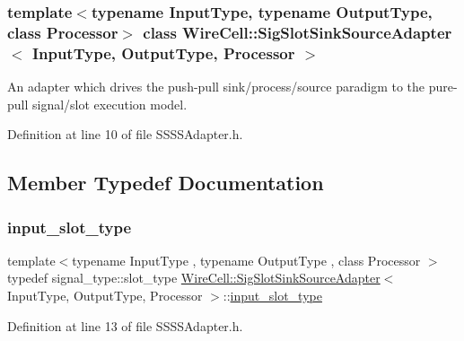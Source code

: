 \subsubsection*{template$<$typename Input\+Type, typename Output\+Type, class Processor$>$\newline
class Wire\+Cell\+::\+Sig\+Slot\+Sink\+Source\+Adapter$<$ Input\+Type, Output\+Type, Processor $>$}

An adapter which drives the push-\/pull sink/process/source paradigm to the pure-\/pull signal/slot execution model. 

Definition at line 10 of file S\+S\+S\+S\+Adapter.\+h.



\subsection{Member Typedef Documentation}
\mbox{\label{class_wire_cell_1_1_sig_slot_sink_source_adapter_ab53f4d64b24e8ff5bc0f7ebd3ceca7dc}} 
\subsubsection{\texorpdfstring{input\+\_\+slot\+\_\+type}{input\_slot\_type}}
{\footnotesize\ttfamily template$<$typename Input\+Type , typename Output\+Type , class Processor $>$ \\
typedef signal\+\_\+type\+::slot\+\_\+type \hyperlink{class_wire_cell_1_1_sig_slot_sink_source_adapter}{Wire\+Cell\+::\+Sig\+Slot\+Sink\+Source\+Adapter}$<$ Input\+Type, Output\+Type, Processor $>$\+::\hyperlink{class_wire_cell_1_1_sig_slot_sink_source_adapter_ab53f4d64b24e8ff5bc0f7ebd3ceca7dc}{input\+\_\+slot\+\_\+type}}



Definition at line 13 of file S\+S\+S\+S\+Adapter.\+h.

\mbox{\label{class_wire_cell_1_1_sig_slot_sink_source_adapter_a40ff5e7ed8db807246a7f1c77ee46a58}} 
